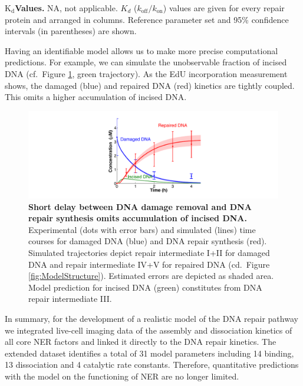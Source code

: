 \begin{landscape}
\begin{table}[t]
\begin{adjustwidth}{-1.1 cm}{}
\captionsetup{width=1.24\textwidth}
\caption{\textbf{$\text{K}_{\text{d}}$Values.} NA, not applicable. $K_d$ ($k_{\text{off}}/k_{\text{on}}$) values are given for every repair protein and arranged in columns. Reference parameter set and 95\% confidence intervals (in parentheses) are shown.}\label{tab:KdValues}
\end{adjustwidth}
\end{table}

\end{landscape}

Having an identifiable model allows us to make more precise computational predictions. For example, we can simulate the unobservable fraction of incised DNA (cf.\ Figure \ref{fig:ModelFit_intermed}, green trajectory). As the EdU incorporation measurement shows, the damaged (blue) and repaired DNA (red) kinetics are tightly coupled. This omits a higher accumulation of incised DNA. 

\begin{figure}[htbp]
	\begin{center}
		\includegraphics[width=1\textwidth]{Abbildungen/figure2_7.pdf}
		\caption{\textbf{Short delay between DNA damage removal and DNA repair synthesis omits accumulation of incised DNA.} Experimental (dots with error bars) and simulated (lines) time courses for damaged DNA (blue) and DNA repair synthesis (red). Simulated trajectories depict repair intermediate I+II for damaged DNA and repair intermediate IV+V for repaired DNA (cd.\ Figure \ref{fig:ModelStructure}). Estimated errors are depicted as shaded area. Model prediction for incised DNA (green) constitutes from DNA repair intermediate III. }
		\label{fig:ModelFit_intermed}
	\end{center}
\end{figure}
In summary, for the development of a realistic model of the DNA repair pathway we integrated live-cell imaging data of the assembly and dissociation kinetics of all core NER factors and linked it directly to the DNA repair kinetics. The extended dataset identifies a total of 31 model parameters including 14 binding, 13 dissociation and 4 catalytic rate constants. Therefore, quantitative predictions with the model on the functioning of NER are no longer limited.  


